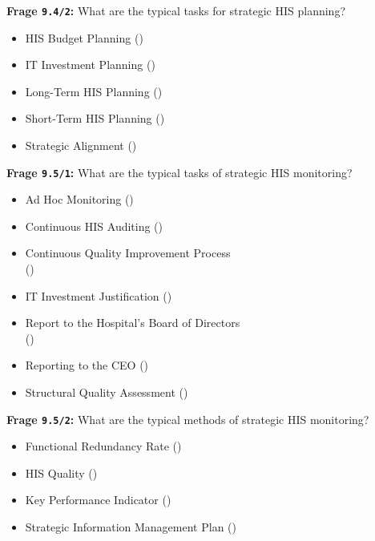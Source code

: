 \textbf{Frage \texttt{9.4/2}:} What are the typical tasks for strategic HIS planning?

\begin{itemize}
  \item HIS Budget Planning ()
  \item IT Investment Planning ()
  \item Long-Term HIS Planning ()
  \item Short-Term HIS Planning ()
  \item Strategic Alignment ()
\end{itemize}

\textbf{Frage \texttt{9.5/1}:} What are the typical tasks of strategic HIS monitoring?

\begin{itemize}
  \item Ad Hoc Monitoring ()
  \item Continuous HIS Auditing ()
  \item Continuous Quality Improvement Process \\
  ()
  \item IT Investment Justification ()
  \item Report to the Hospital’s Board of Directors \\
  ()
  \item Reporting to the CEO ()
  \item Structural Quality Assessment ()
\end{itemize}

\textbf{Frage \texttt{9.5/2}:} What are the typical methods of strategic HIS monitoring?

\begin{itemize}
  \item Functional Redundancy Rate ()
  \item HIS Quality ()
  \item Key Performance Indicator ()
  \item Strategic Information Management Plan ()
\end{itemize}

